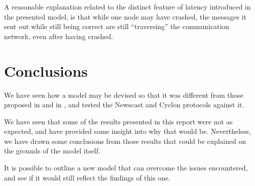 \documentclass[a4paper]{ifacconf}
\begin{document}
A reasonable explanation related to the distinct feature of latency introduced in the presented model, is that while one node may have crashed, the messages it sent out while still being correct are still ``traversing'' the communication network, even after having crashed.

\section{Conclusions}

We have seen how a model may be devised so that it was different from those proposed in \cite{newscast} and in \cite{cyclon}, and tested the Newscast and Cyclon protocols against it.

We have seen that some of the results presented in this report were not as expected, and have provided some insight into why that would be.
Nevertheless, we have drawn some conclusions from those results that could be explained on the grounds of the model itself.

It is possible to outline a new model that can overcome the issues encountered, and see if it would still reflect the findings of this one.



\end{document}
